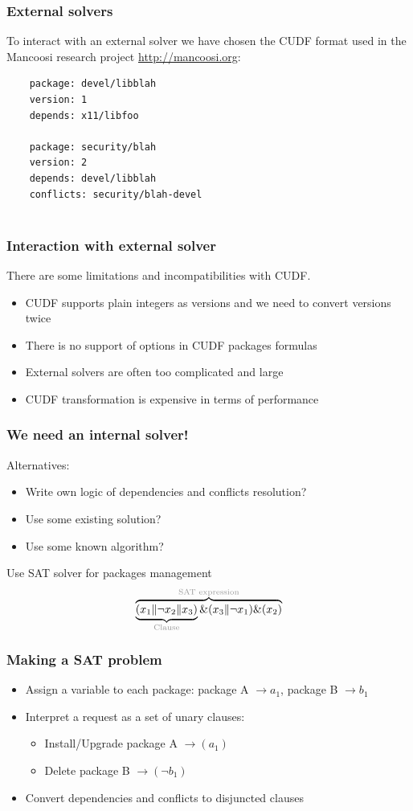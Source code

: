 \documentclass{beamer}
\begin{document}
\begin{frame}[fragile]
\frametitle{External solvers}
To interact with an external solver we have chosen the CUDF format used in the
Mancoosi research project \url{http://mancoosi.org}:
\bigskip
{\small
	\begin{verbatim}
	package: devel/libblah
	version: 1
	depends: x11/libfoo

	package: security/blah
	version: 2
	depends: devel/libblah
	conflicts: security/blah-devel
	
	\end{verbatim}
}
\end{frame}

\begin{frame}
\frametitle{Interaction with external solver}
There are some limitations and incompatibilities with CUDF.
\begin{itemize}
  \item CUDF supports plain integers as versions and we need to convert
  versions twice
  \item There is no support of options in CUDF packages formulas
  \item External solvers are often too complicated and large
  \item CUDF transformation is expensive in terms of performance
\end{itemize}
\end{frame}

\begin{frame}
\frametitle{We need an internal solver!}

Alternatives:
\begin{itemize}
  \item Write own logic of dependencies and conflicts resolution?
  \pause
  \item Use some existing solution?
  \pause
  \item Use some known algorithm?
  \pause
\end{itemize}
\bigskip
{\large Use SAT solver for packages management}
\bigskip
\[
\overbrace{\underbrace{(x_1 \| \neg x_2 \|
x_3)}_{\text{\color{light-gray}Clause}} \& (x_3 \| \neg x_1) \&
(x_2)}^{\text{\color{light-gray}SAT expression}}
\]
\end{frame}

\begin{frame}
\frametitle{Making a SAT problem}
\begin{itemize}
  \item Assign a variable to each package: 
  package A $\to a_1$, package B $\to b_1$
  \item Interpret a request as a set of unary clauses:
  \begin{itemize}
    \item Install/Upgrade package A $\to (a_1)$
    \item Delete package B $\to (\neg b_1)$
  \end{itemize}
  \item Convert dependencies and conflicts to disjuncted clauses
\end{itemize}

\end{frame}
\end{document}
